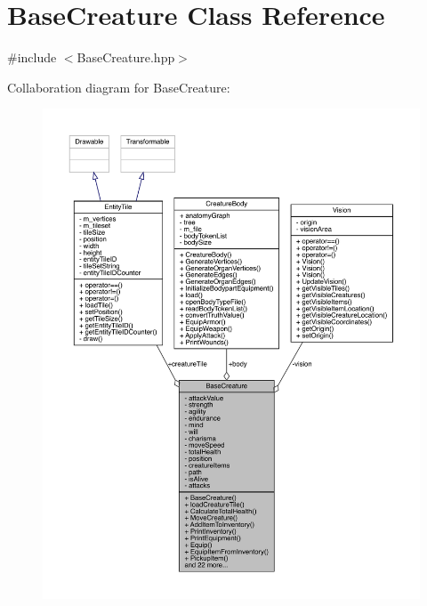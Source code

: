 \hypertarget{class_base_creature}{}\section{Base\+Creature Class Reference}
\label{class_base_creature}


{\ttfamily \#include $<$Base\+Creature.\+hpp$>$}



Collaboration diagram for Base\+Creature\+:
\nopagebreak
\begin{figure}[H]
\begin{center}
\leavevmode
\includegraphics[width=350pt]{class_base_creature__coll__graph}
\end{center}
\end{figure}
